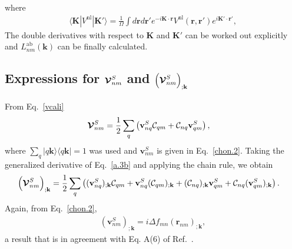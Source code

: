 \documentclass[floatfix,prb,aps,superscriptaddress,showpacs,11pt,preprint,letterpaper]{revtex4}
\begin{document}
where
\begin{align}\label{vkk}
\langle\mathbf{K} |
V^\mathrm{nl} 
| \mathbf{K}'\rangle
=
\frac{1}{\Omega}
\int 
d\mathbf{r} d\mathbf{r}' 
 e^{-i\mathbf{K}\cdot\mathbf{r}}
V^\mathrm{nl}(\mathbf{r},\mathbf{r}') 
e^{i\mathbf{K}'\cdot\mathbf{r}'}
,
\end{align}
The double derivatives with respect to $\mathbf{K}$ and $\mathbf{K}'$ 
can be worked out explicitly and 
$L^{\mathrm{a}\mathrm{b}}_{nm}(\mathbf{k})$
can be finally calculated.\cite{valerie}

\subsection{Expressions for  \texorpdfstring{$\boldsymbol{\mathcal{\cal V}}^{S}_{nm}$}{Vnm}
and
\texorpdfstring{$\Big({\boldsymbol{\mathcal{\cal V}}}^{S}_{nm}\Big)_{;\mathbf{k}}$}{(Vnm);kb}
}\label{calvs} 

From Eq.~\eqref{vcali}
\begin{align}\label{a.3b}
\boldsymbol{\mathcal{\cal V}}^{S}_{nm}
&=
\frac{1}{2}\sum_q\left(   
\mathbf{v}^S_{nq}{\mathbf{\cal C}}_{qm}+{\mathbf{\cal C}}_{nq}\mathbf{v}^S_{qm}
\right)  
,
\end{align}    
where $\sum_q | q\mathbf{k}\rangle\langle q\mathbf{k} | =1$ was used
and $\mathbf{v}^S_{nm}$ is given in Eq.~\eqref{chon.2}.
Taking the generalized derivative of Eq.~\eqref{a.3b}
and applying
the chain rule, we obtain
\begin{align}\label{a.3bn}
\left(\boldsymbol{\mathcal{\cal V}}^{S}_{nm}\right)_{;\mathbf{k}}
&=
\frac{1}{2}\sum_q\left(
(\mathbf{v}^S_{nq})_{;\mathbf{k}}{\mathbf{\cal C}}_{qm}
+    
\mathbf{v}^S_{nq}({\mathbf{\cal C}}_{qm})_{;\mathbf{k}}
+
({\mathbf{\cal C}}_{nq})_{;\mathbf{k}} \mathbf{v}^S_{qm}
+
{\mathbf{\cal C}}_{nq} (\mathbf{v}^S_{qm})_{;\mathbf{k}}
\right)  
.
\end{align}    
Again, from
Eq.~\eqref{chon.2}, 
\begin{align}\label{choni.1}
(\mathbf{v}^S_{nm})_{;\mathbf{k}}=i\Delta f_{mn}
(\mathbf{r}_{nm})_{;\mathbf{k}}
,
\end{align}
a result that is in agreement with Eq. A(6) of Ref.~.

\newpage

\end{document}
